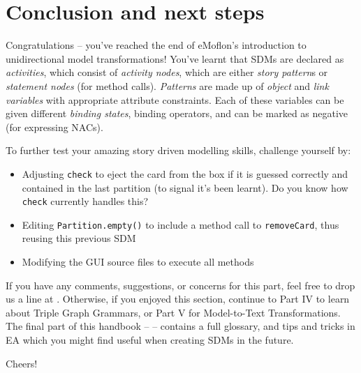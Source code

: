 \genHeader
\section{Conclusion and next steps}

\vspace{0.5cm}

Congratulations -- you've reached the end of eMoflon's introduction to unidirectional model transformations! You've learnt that SDMs are declared as
\emph{activities}, which consist of \emph{activity nodes}, which are either \emph{story pattern}s or \emph{statement nodes} (for method calls).
\emph{Patterns} are made up of \emph{object} and \emph{link variables} with appropriate attribute constraints. Each of these variables can be given
different \emph{binding states}, binding operators, and can be marked as negative (for expressing NACs).

\vspace{0.5cm}

To further test your amazing story driven modelling skills, challenge yourself by:
\begin{itemize}
\item Adjusting \texttt{check} to eject the card from the box if it is guessed correctly and contained in the last partition (to signal it's been learnt). Do
you know how \texttt{check} currently handles this?
\item Editing \texttt{Partition.empty()} to include a method call to \texttt{removeCard}, thus reusing this previous SDM
\item Modifying the GUI source files to execute all methods
\end{itemize}

\vspace{0.5cm}
	
If you have any comments, suggestions, or concerns for this part, feel free to drop us a line at \eMoflonContact.
Otherwise, if you enjoyed this section, continue to Part IV to learn about Triple Graph Grammars, or Part V for Model-to-Text Transformations.
The final part of this handbook --  -- contains a full glossary, and tips and tricks in EA which you might find useful when creating SDMs in the future.

Cheers!
